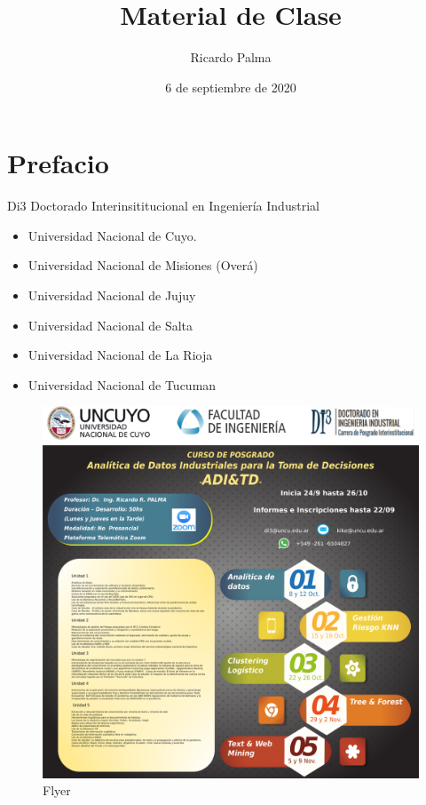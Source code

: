 \documentclass[]{article}
\title{Material de Clase}
\author{Ricardo Palma}
\date{6 de septiembre de 2020}
\providecommand{\tightlist}{%
  \setlength{\itemsep}{0pt}\setlength{\parskip}{0pt}}
\begin{document}
\maketitle

{
\setcounter{tocdepth}{2}
\tableofcontents
}
\section*{Prefacio}\label{prefacio}

Di3 Doctorado Interinsititucional en Ingeniería Industrial

\begin{itemize}
\tightlist
\item
  Universidad Nacional de Cuyo.
\item
  Universidad Nacional de Misiones (Overá)
\item
  Universidad Nacional de Jujuy
\item
  Universidad Nacional de Salta
\item
  Universidad Nacional de La Rioja
\item
  Universidad Nacional de Tucuman
\end{itemize}

\begin{figure}
\centering
\includegraphics{Flyer3.png}
\caption{Flyer}
\end{figure}
\end{document}
